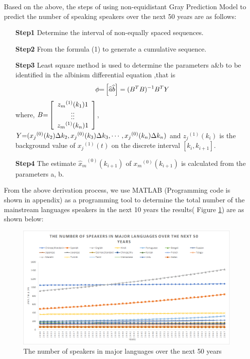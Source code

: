 Based on the above, the steps of using non-equidistant Gray Prediction Model to predict the number of speaking speakers over the next 50 years are as follows:

 \begin{enumerate}
 \item[\textbf{Step1}]  Determine the interval of non-equally spaced sequences.
 \item[\textbf{Step2}] From the formula (1) to generate a cumulative sequence.
 \item[\textbf{Step3}] Least square method is used to determine the parameters a\&b to be identified in the albinism differential equation ,that is
		 \begin{equation}
		 \phi {\rm{ = }}\left[ {\widehat a\widehat b} \right] = {({B^T}B)^{ - 1}}{B^T}Y 
		 \end{equation}
	where, $B{\rm{ = }}\left[ {\begin{array}{*{20}{c}}
		{{z_m}^{(1)}({k_1})}1\\
		\vdots  \vdots \\
		{{z_m}^{(1)}({k_n})}1
		\end{array}} \right]$, $Y{\rm{ = }}({x_j}^{(0)}({k_2})\Delta {k_2},{x_j}^{(0)}({k_3})\Delta {k_3}, \cdots ,{x_j}^{(0)}({k_n})\Delta {k_n})$ and ${z_j}^{(1)}({k_i})$  is the background value  of ${x_j}^{(1)}(t)$  on the discrete interval  $\left[ {{k_i},{k_{i + 1}}} \right]$.
  \item[\textbf{Step4}] The estimate ${\widehat x_m}^{(0)}({k_{i + 1}})$ of ${x_m}^{(0)}({k_{i + 1}})$  is calculated from the parameters a, b.
\end{enumerate}

From the above derivation process, we use MATLAB (Programming code is shown in appendix) as a programming tool to determine the total number of the mainstream languages speakers in the next 10 years the results( Figure \ref{fig:next50}) are as shown below:
     

\begin{figure}[H]
	\centering
	\includegraphics[width=1\linewidth]{figures/next50number}
	\caption{The number of speakers in major languages over the next 50 years}
	\label{fig:next50}
\end{figure}


